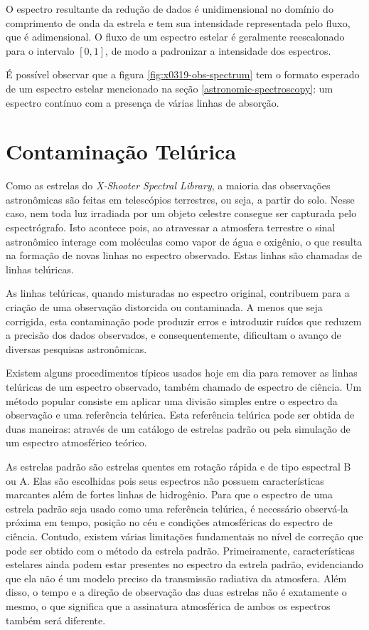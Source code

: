 O espectro resultante da redução de dados é unidimensional no domínio do comprimento de onda da estrela e tem sua intensidade representada pelo fluxo, que é adimensional. O fluxo de um espectro estelar é geralmente reescalonado para o intervalo $[0, 1]$, de modo a padronizar a intensidade dos espectros. 

É possível observar que a figura \ref{fig:x0319-obs-spectrum} tem o formato esperado de um espectro estelar mencionado na seção \ref{astronomic-spectroscopy}: um espectro contínuo com a presença de várias linhas de absorção.


\section{Contaminação Telúrica}

Como as estrelas do \textit{X-Shooter Spectral Library}, a maioria das observações astronômicas são feitas em telescópios terrestres, ou seja, a partir do solo. Nesse caso, nem toda luz irradiada por um objeto celestre consegue ser capturada pelo espectrógrafo. Isto acontece pois, ao atravessar a atmosfera terrestre o sinal astronômico interage com moléculas como vapor de água e oxigênio, o que resulta na formação de novas linhas no espectro observado. Estas linhas são chamadas de linhas telúricas.

As linhas telúricas, quando misturadas no espectro original, contribuem para a criação de uma observação distorcida ou contaminada. A menos que seja corrigida, esta contaminação pode produzir erros e introduzir ruídos que reduzem a precisão dos dados observados, e consequentemente, dificultam o avanço de diversas pesquisas astronômicas.

Existem alguns procedimentos típicos usados hoje em dia para remover as linhas telúricas de um espectro observado, também chamado de espectro de ciência. Um método popular consiste em aplicar uma divisão simples entre o espectro da observação e uma referência telúrica. Esta referência telúrica pode ser obtida de duas maneiras: através de um catálogo de estrelas padrão ou pela simulação de um espectro atmosférico teórico.

As estrelas padrão são estrelas quentes em rotação rápida e de tipo espectral B ou A. Elas são escolhidas pois seus espectros não possuem características marcantes além de fortes linhas de hidrogênio. Para que o espectro de uma estrela padrão seja usado como uma referência telúrica, é necessário observá-la próxima em tempo, posição no céu e condições atmosféricas do espectro de ciência. Contudo, existem várias limitações fundamentais no nível de correção que pode ser obtido com o método da estrela padrão. Primeiramente, características estelares ainda podem estar presentes no espectro da estrela padrão, evidenciando que ela não é um modelo preciso da transmissão radiativa da atmosfera. Além disso, o tempo e a direção de observação das duas estrelas não é exatamente o mesmo, o que significa que a assinatura atmosférica de ambos os espectros também será diferente.

